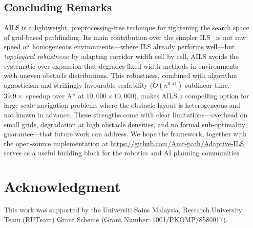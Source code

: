 \documentclass[journal]{IEEEtran}
\begin{document}
\subsection{Concluding Remarks}

AILS is a lightweight, preprocessing-free technique for tightening the search space of grid-based pathfinding.
Its main contribution over the simpler ILS~\cite{elshahed2025ils} is not raw speed on homogeneous environments---where ILS already performs well---but \emph{topological robustness}: by adapting corridor width cell by cell, AILS avoids the systematic over-expansion that degrades fixed-width methods in environments with uneven obstacle distributions.
This robustness, combined with algorithm agnosticism and strikingly favourable scalability ($O(n^{0.51})$ sublinear time, $39.9{\times}$ speedup over A* at $10{,}000{\times}10{,}000$), makes AILS a compelling option for large-scale navigation problems where the obstacle layout is heterogeneous and not known in advance.
These strengths come with clear limitations---overhead on small grids, degradation at high obstacle densities, and no formal sub-optimality guarantee---that future work can address.
We hope the framework, together with the open-source implementation at \url{https://github.com/Amr-path/Adaptive-ILS}, serves as a useful building block for the robotics and AI planning communities.

\section*{Acknowledgment}

This work was supported by the Universiti Sains Malaysia, Research University Team (RUTeam) Grant Scheme (Grant Number: 1001/PKOMP/8580017).



\end{document}
